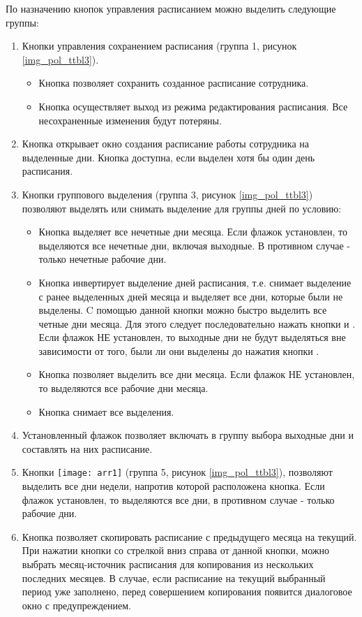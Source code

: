 {По назначению кнопок управления расписанием можно выделить следующие группы:
\begin{enumerate}
 \item Кнопки управления сохранением расписания (группа 1, рисунок \ref{img_pol_ttbl3}). 
 \begin{itemize}
  \item Кнопка  позволяет сохранить созданное расписание сотрудника.
  \item Кнопка  осуществляет выход из режима редактирования расписания. Все несохраненные изменения будут потеряны.
 \end{itemize}
 \item Кнопка  открывает окно создания расписание работы сотрудника на выделенные дни. Кнопка доступна, если выделен хотя бы один день расписания.
 \item Кнопки группового выделения (группа 3, рисунок \ref{img_pol_ttbl3}) позволяют выделять или снимать выделение для группы дней по условию:
 \begin{itemize}
  \item Кнопка  выделяет все нечетные дни месяца. Если флажок  установлен, то выделяются все нечетные дни, включая выходные. В противном случае - только нечетные рабочие дни.
 \item Кнопка  инвертирует выделение дней расписания, т.е. снимает выделение с ранее выделенных дней месяца и выделяет все дни, которые были не выделены. C помощью данной кнопки можно быстро выделить все четные дни месяца. Для этого следует последовательно нажать кнопки  и . Если флажок  НЕ установлен, то выходные дни не будут выделяться вне зависимости от того, были ли они выделены до нажатия кнопки .
 \item Кнопка  позволяет выделить все дни месяца. Если флажок  НЕ установлен, то выделяются все рабочие дни месяца.
 \item Кнопка  снимает все выделения.
 \end{itemize}
 \item Установленный флажок  позволяет включать в группу выбора выходные дни и составлять на них расписание.
 \item Кнопки \texttt{[image: arr1]} (группа 5, рисунок \ref{img_pol_ttbl3}),   позволяют выделить все дни недели, напротив которой расположена кнопка. Если флажок  установлен, то выделяются все дни, в противном случае - только рабочие дни.
 \item Кнопка  позволяет скопировать расписание с предыдущего месяца на текущий. При нажатии кнопки со стрелкой вниз справа от данной кнопки, можно выбрать месяц-источник расписания для копирования из нескольких последних месяцев. В случае, если расписание на текущий выбранный период уже заполнено, перед совершением копирования появится диалоговое окно с предупреждением. 
\end{enumerate}

}
